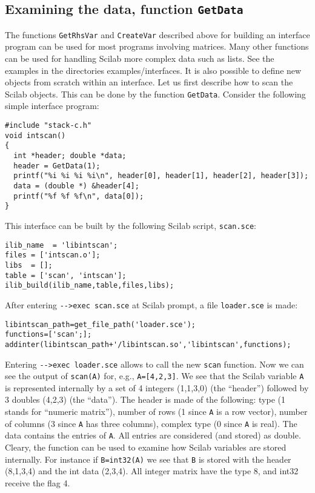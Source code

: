 \subsection{Examining the data, function {\tt GetData}}
The functions {\tt GetRhsVar} and {\tt CreateVar}
described above for building an interface program can be used for
most programs involving matrices. Many other functions can be used 
for handling Scilab more complex data such as lists. See the examples
in the directories examples/interfaces.
It is also possible to define new objects from scratch within an interface.
Let us first describe how to scan the Scilab objects. This can be done by the
function {\tt GetData}.
Consider the following simple interface program:
\begin{verbatim}
#include "stack-c.h"
void intscan() 
{
  int *header; double *data;
  header = GetData(1);
  printf("%i %i %i %i\n", header[0], header[1], header[2], header[3]);
  data = (double *) &header[4];
  printf("%f %f %f\n", data[0]);
}
\end{verbatim}
This interface can be built by the following Scilab script, \verb!scan.sce!:
\begin{verbatim}
ilib_name  = 'libintscan';
files = ['intscan.o'];
libs  = [];
table = ['scan', 'intscan'];
ilib_build(ilib_name,table,files,libs);
\end{verbatim}
After entering \verb!-->exec scan.sce! at Scilab prompt, a file \verb!loader.sce! is made:
\begin{verbatim}
libintscan_path=get_file_path('loader.sce');
functions=['scan';];
addinter(libintscan_path+'/libintscan.so','libintscan',functions);
\end{verbatim}
Entering \verb!-->exec loader.sce! allows to call the new \verb!scan! function.
Now we can see the output of \verb!scan(A)! for, e.g., \verb!A=[4,2,3]!.
We see that the Scilab variable \verb!A! is represented internally by
a set of 4 integers (1,1,3,0) (the ``header'')  followed by 3 
doubles (4,2,3) (the ``data''). The header is made of the following:
type (1 stands for ``numeric matrix''), number of rows (1 since \verb!A! 
is a row vector), number of columns (3 since \verb!A! has three 
columns), complex type (0 since \verb!A! is real). The data contains 
the entries of \verb!A!. All entries are considered (and stored) as double.
Cleary, the function can be used to examine how Scilab variables are stored
internally. For instance if \verb!B=int32(A)! we see that \verb!B! is stored
with the header (8,1,3,4) and the int data (2,3,4). All integer matrix have 
the type 8, and int32 receive the flag 4.

